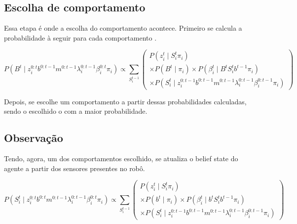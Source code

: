 \subsection{Escolha de comportamento}

Essa etapa é onde a escolha do comportamento acontece. Primeiro se calcula a probabilidade à seguir para cada comportamento .

\begin{equation}
    P \left( B^t \mid z_i^{0: t} b^{0: t-1} m^{0: t-1} \lambda_i^{0: t-1} \beta_i^{0: t} \pi_i \right) \propto \sum\limits_{S_i^{t-1}}
        \left(
            \begin{array}{l}
                P \left( z_i^t \mid S_i^t \pi_i \right) \\
                \times P \left( B^t \mid \pi_i \right) \times   P \left( \beta_i^t \mid B^t S_i^t b^{t-1} \pi_i \right) \\
                \times P \left( S_i^t \mid z_i^{0: t-1} b^{0: t-1} m^{0: t-1} \lambda_i^{0: t-1} \beta_i^{0: t-1} \pi_i \right)
            \end{array}
        \right)
\end{equation}

Depois, se escolhe um comportamento a partir dessas probabilidades calculadas, sendo o escolhido o com a maior probabilidade.

\subsection{Observação}

Tendo, agora, um dos comportamentos escolhido, se atualiza o belief state do agente a partir dos sensores presentes no robô.

\begin{equation}
    P \left( S_i^t \mid z_i^{0: t} b^{0: t} m^{0: t-1} \lambda_i^{0: t-1} \beta_i^{0: t} \pi_i \right) \propto \sum\limits_{S_i^{t-1}}
        \left(
            \begin{array}{l}
                P \left( z_i^t \mid S_i^t \pi_i \right) \\
                \times P \left( b^t \mid \pi_i \right) \times   P \left( \beta_i^t \mid b^t S_i^t b^{t-1} \pi_i \right) \\
                \times P \left( S_i^t \mid z_i^{0: t-1} b^{0: t-1} m^{0: t-1} \lambda_i^{0: t-1} \beta_i^{0: t-1} \pi_i \right)
            \end{array}
        \right)
\end{equation}


